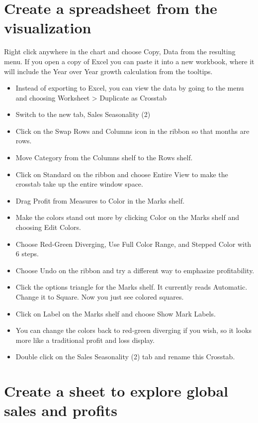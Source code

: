 \section{Create a spreadsheet from the
visualization}\label{create-a-spreadsheet-from-the-visualization}

Right click anywhere in the chart and choose Copy, Data from the
resulting menu. If you open a copy of Excel you can paste it into a new
workbook, where it will include the Year over Year growth calculation
from the tooltips.

\begin{itemize}
\tightlist
\item
  Instead of exporting to Excel, you can view the data by going to the
  menu and choosing Worksheet \textgreater{} Duplicate as Crosstab
\item
  Switch to the new tab, Sales Seasonality (2)
\item
  Click on the Swap Rows and Columns icon in the ribbon so that months
  are rows.
\item
  Move Category from the Columns shelf to the Rows shelf.
\item
  Click on Standard on the ribbon and choose Entire View to make the
  crosstab take up the entire window space.
\item
  Drag Profit from Measures to Color in the Marks shelf.
\item
  Make the colors stand out more by clicking Color on the Marks shelf
  and choosing Edit Colors.
\item
  Choose Red-Green Diverging, Use Full Color Range, and Stepped Color
  with 6 steps.
\item
  Choose Undo on the ribbon and try a different way to emphasize
  profitability.
\item
  Click the options triangle for the Marks shelf. It currently reads
  Automatic. Change it to Square. Now you just see colored squares.
\item
  Click on Label on the Marks shelf and choose Show Mark Labels.
\item
  You can change the colors back to red-green diverging if you wish, so
  it looks more like a traditional profit and loss display.
\item
  Double click on the Sales Seasonality (2) tab and rename this
  Crosstab.
\end{itemize}

\section{Create a sheet to explore global sales and
profits}\label{create-a-sheet-to-explore-global-sales-and-profits}

